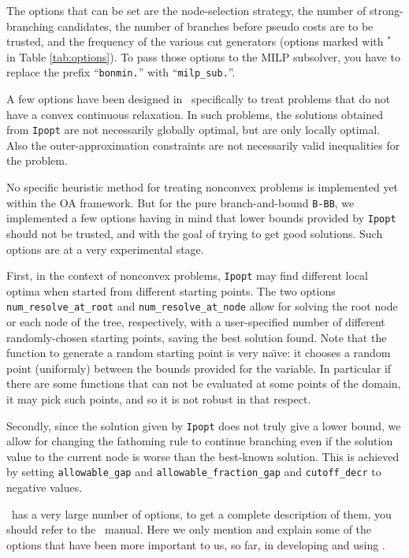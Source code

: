 The options that can be set are the node-selection strategy, the number of strong-branching candidates,
the number of branches before pseudo costs are to be trusted, and the frequency of the various cut generators
(options marked with $^*$ in Table \ref{tab:options}). To pass those options to the MILP subsolver, you have
to replace the prefix ``{\tt bonmin.}'' with ``{\tt milp\_sub.}''.


\label{sec:non_convex}
A few options have been designed in \Bonmin\ specifically to treat
problems that do not have a convex continuous relaxation.
In such problems, the solutions obtained from {\tt Ipopt} are
not necessarily globally optimal, but are only locally optimal. Also the outer-approximation
constraints are not necessarily valid inequalities for the problem.

No specific heuristic method for treating nonconvex problems is implemented
yet within the OA framework.
But for the pure branch-and-bound {\tt B-BB}, we implemented a few options having
in mind that lower bounds provided by {\tt Ipopt} should not be trusted, and with the goal of
trying to get good solutions. Such options are at a very experimental stage.

First, in the context of nonconvex problems, {\tt Ipopt} may find different local optima when started
from different starting points. The two options {\tt num\_re\-solve\_at\_root} and {\tt num\_resolve\_at\_node}
allow for solving the root node or each node of the tree, respectively, with a user-specified
number of different randomly-chosen
starting points, saving the best solution found. Note that the function to generate a random starting point
is very na\"{\i}ve: it chooses a random point (uniformly) between the bounds provided for the variable.
In particular if there are some functions
that can not be evaluated at some points of the domain, it may pick such points,
 and so it is not robust in that respect.

Secondly, since the solution given by {\tt Ipopt} does not truly give a lower bound, we allow for
changing the fathoming rule
to continue branching even if the solution value to the current node is worse
than the best-known
solution. This is achieved by setting {\tt allowable\_gap}
and {\tt allowable\_fraction\_gap} and {\tt cutoff\_decr} to negative values.

\label{sec:opt_ipopt}
\Ipopt\ has a very large number of options, to get a complete description of them, you
should refer to the \Ipopt\ manual.
Here we only mention and explain some of the options that have been more important to us, so far,
in developing and using \Bonmin.
